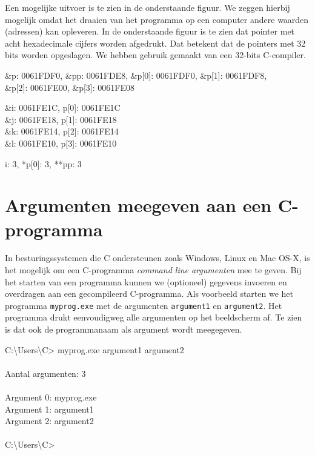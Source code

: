 Een mogelijke uitvoer is te zien in de onderstaande figuur. We zeggen hierbij mogelijk omdat het draaien van het programma op een computer andere waarden (adressen) kan opleveren. In de onderstaande figuur is te zien dat pointer met acht hexadecimale cijfers worden afgedrukt.  Dat betekent dat de pointers met 32 bits worden opgeslagen. We hebben gebruik gemaakt van een 32-bits C-compiler.

\begin{dosbox}
\&p: 0061FDF0, \&pp: 0061FDE8, \&p[0]: 0061FDF0, \&p[1]: 0061FDF8,\\ \&p[2]: 0061FE00, \&p[3]: 0061FE08

\&i: 0061FE1C, p[0]: 0061FE1C\\
\&j: 0061FE18, p[1]: 0061FE18\\
\&k: 0061FE14, p[2]: 0061FE14\\
\&l: 0061FE10, p[3]: 0061FE10

i: 3, *p[0]: 3, **pp: 3
\end{dosbox}



\section{Argumenten meegeven aan een C-programma}
\label{sec:argumentenmeegevenaaneencprogramma}
In besturingssystemen die C ondersteunen zoals Windows, Linux en Mac OS-X, is het mogelijk om een C-programma \textsl{command line argumenten} mee te geven. Bij het starten van een programma kunnen we (optioneel) gegevens invoeren en overdragen aan een gecompileerd C-programma. Als voorbeeld starten we het programma \texttt{myprog.exe} met de argumenten \texttt{argument1} en \texttt{argument2}. Het programma drukt eenvoudigweg alle argumenten op het beeldscherm af. Te zien is dat ook de programmanaam als argument wordt meegegeven.

\begin{dosbox}
C:\textbackslash Users\textbackslash C> myprog.exe argument1 argument2\\
\\
Aantal argumenten: 3\\
\\
Argument 0: myprog.exe\\
Argument 1: argument1\\
Argument 2: argument2\\
\\
C:\textbackslash Users\textbackslash C>
\end{dosbox}

